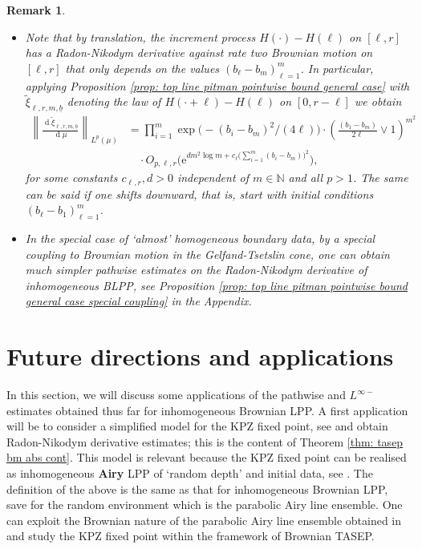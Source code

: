\documentclass[11pt, reqno]{amsart}
\numberwithin{equation}{section}
\newtheorem*{remark}{Remark}
\newcommand{\N}{\ensuremath{\mathbb{N}}}
\newcommand{\norm}[1]{\left\lVert#1\right\rVert}
\newcommand{\diff}{\ensuremath{\operatorname{d}\!}}
\begin{document}
\begin{remark}
\begin{itemize}
    \item Note that by translation, the increment process $H(\cdot)-H(\ell)$ on $[\ell,r]$ has a Radon-Nikodym  derivative against rate two Brownian motion on $[\ell,r]$ that only depends on the values $(b_\ell-b_m)_{\ell = 1}^m$. In particular, applying Proposition \ref{prop: top line pitman pointwise bound general case} with $\tilde{\xi}_{\ell, r, m, \underline{b}}$ denoting the law of $H(\cdot+\ell)-H(\ell)$ on $[0,r-\ell]$ we obtain
     \begin{equation*}
     \begin{array}{cc}
         \norm{\frac{\diff \tilde{\xi}_{\ell, r, m, \underline{b}}}{\diff\mu}}_{L^p(\mu)} &= \displaystyle\prod^m_{i=1}\exp\big(-(b_i-b_m)^2/(4\ell)\big)\cdot \left(\frac{(b_1-b_m)}{2\ell}\lor 1\right)^{m^2}\\
         & \quad \cdot O_{p,\ell, r}\Bigg(\mathrm{e}^{d m^2\log m + c_{\ell} \big(\sum_{i=1}^m (b_i-b_m)\big)^2}\Bigg),
    \end{array}
     \end{equation*}
     for some constants $c_{\ell,r},d>0$ independent of $m\in \N$ and all $p>1$. The same can be said if one shifts downward, that is, start with initial conditions $(b_\ell-b_1)_{\ell = 1}^m$.
    \item In the special case of `almost' homogeneous boundary data, by a special coupling to Brownian motion in the Gelfand-Tsetslin cone, one can obtain much simpler pathwise estimates on the Radon-Nikodym derivative of inhomogeneous BLPP, see Proposition \ref{prop: top line pitman pointwise bound general case special coupling} in the Appendix.
\end{itemize}
\end{remark}

\section{Future directions and applications}\label{sec: future directions and applications}\label{sec: misc}

In this section, we will discuss some applications of the pathwise and $L^{\infty-}$ estimates obtained thus far for inhomogeneous Brownian LPP. A first application will be to consider a simplified model for the KPZ fixed point, see \cite{Sarkar2021Brownian} and obtain Radon-Nikodym derivative estimates; this is the content of Theorem \ref{thm: tasep bm abs cont}. This model is relevant because the KPZ fixed point can be realised as inhomogeneous \textbf{Airy} LPP of `random depth' and initial data, see \cite{Sarkar2021Brownian}. The definition of the above is the same as that for inhomogeneous Brownian LPP, save for the random environment which is the parabolic Airy line ensemble. One can exploit the Brownian nature of the parabolic Airy line ensemble obtained in \cite{Corwin2014Brownian} and study the KPZ fixed point within the framework of Brownian TASEP.
\end{document}
